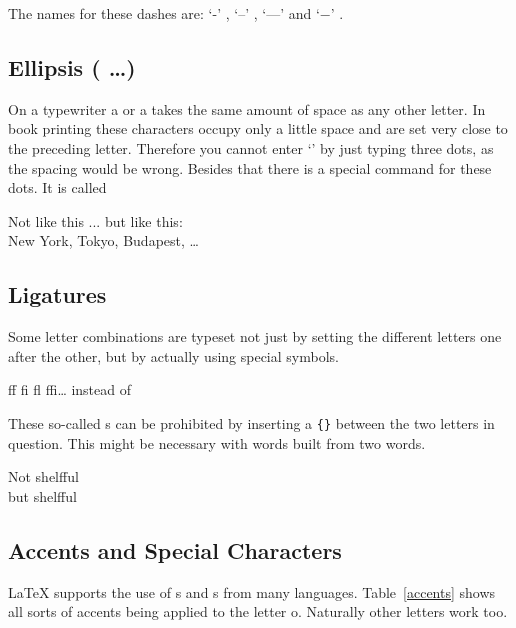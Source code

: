 The names for these dashes are: 
`-' , `--' , `---'  and
`$-$' .

\subsection{Ellipsis ( \ldots )}

On a typewriter a  or a  takes the same amount of
space as any other letter. In book printing these characters occupy
only a little space and are set very close to the preceding letter.
Therefore you cannot enter `' by just typing three
dots, as the spacing would be wrong. Besides that there is a special
command for these dots. It is called

\begin{command}
\end{command}

\begin{example}
Not like this ... but like this:\\
New York, Tokyo, Budapest, \ldots
\end{example}
 
\subsection{Ligatures}

Some letter combinations are typeset not just by setting the
different letters one after the other, but by actually using special
symbols.
\begin{code}
{\large ff fi fl ffi\ldots}\quad
instead of
\end{code}
These so-called s can be prohibited by inserting a \verb|{}|
between the two letters in question. This might be necessary with
words built from two words.

\begin{example}
Not shelfful\\
but shelf\mbox{}ful
\end{example}
 
\subsection{Accents and Special Characters}
 
\LaTeX{} supports the use of s and s
from many languages. Table~\ref{accents} shows all sorts of accents
being applied to the letter o. Naturally other letters work too.

